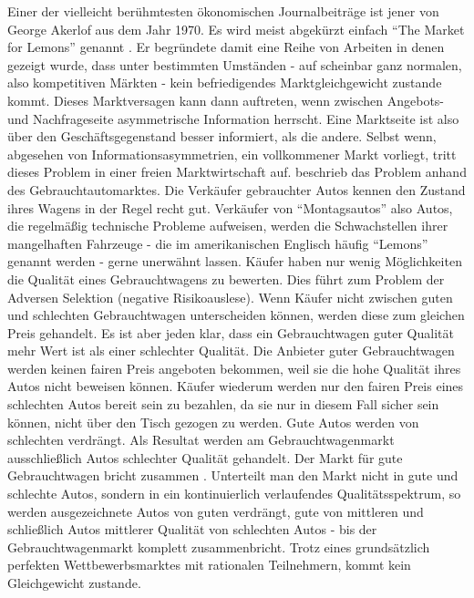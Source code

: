 Einer der vielleicht berühmtesten ökonomischen Journalbeiträge ist jener von George Akerlof aus dem Jahr 1970. Es wird meist abgekürzt einfach "`The Market for Lemons"' genannt \parencite{Akerlof1970}. Er begründete damit eine Reihe von Arbeiten in denen gezeigt wurde, dass unter bestimmten Umständen - auf scheinbar ganz normalen, also kompetitiven Märkten - kein befriedigendes Marktgleichgewicht zustande kommt. Dieses Marktversagen kann dann auftreten, wenn zwischen Angebots- und Nachfrageseite asymmetrische Information herrscht. Eine Marktseite ist also über den Geschäftsgegenstand besser informiert, als die andere. Selbst wenn, abgesehen von Informationsasymmetrien, ein vollkommener Markt vorliegt, tritt dieses Problem in einer freien Marktwirtschaft auf. \textcite{Akerlof1970} beschrieb das Problem anhand des Gebrauchtautomarktes. Die Verkäufer gebrauchter Autos kennen den Zustand ihres Wagens in der Regel recht gut. Verkäufer von "`Montagsautos"'  also Autos, die regelmäßig technische Probleme aufweisen, werden die Schwachstellen ihrer mangelhaften Fahrzeuge - die im amerikanischen Englisch häufig "`Lemons"' genannt werden - gerne unerwähnt lassen. Käufer haben nur wenig Möglichkeiten die Qualität eines Gebrauchtwagens zu bewerten. Dies führt zum Problem der Adversen Selektion (negative Risikoauslese). Wenn Käufer nicht zwischen guten und schlechten Gebrauchtwagen unterscheiden können, werden diese zum gleichen Preis gehandelt. Es ist aber jeden klar, dass ein Gebrauchtwagen guter Qualität mehr Wert ist als einer schlechter Qualität. Die Anbieter guter Gebrauchtwagen werden keinen fairen Preis angeboten bekommen, weil sie die hohe Qualität ihres Autos nicht beweisen können. Käufer wiederum werden nur den fairen Preis eines schlechten Autos bereit sein zu bezahlen, da sie nur in diesem Fall sicher sein können, nicht über den Tisch gezogen zu werden. Gute Autos werden von schlechten verdrängt. Als Resultat werden am Gebrauchtwagenmarkt ausschließlich Autos schlechter Qualität gehandelt. Der Markt für gute Gebrauchtwagen bricht zusammen \parencite[S. 490]{Akerlof1970}. Unterteilt man den Markt nicht in gute und schlechte Autos, sondern in ein kontinuierlich verlaufendes Qualitätsspektrum, so werden  ausgezeichnete Autos von guten verdrängt, gute von mittleren und schließlich Autos mittlerer Qualität von schlechten Autos - bis der Gebrauchtwagenmarkt komplett zusammenbricht. Trotz eines grundsätzlich perfekten Wettbewerbsmarktes mit rationalen Teilnehmern, kommt kein Gleichgewicht zustande.

